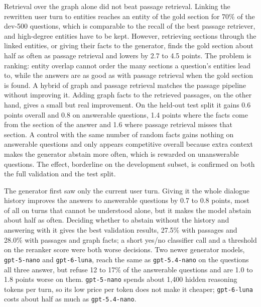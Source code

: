 Retrieval over the graph alone did not beat passage retrieval. Linking the rewritten
user turn to entities reaches an entity of the gold section for 70\% of the dev-500
questions, which is comparable to the recall of the best passage retriever, and
high-degree entities have to be kept. However, retrieving sections through the linked
entities, or giving their facts to the generator, finds the gold section about half as
often as passage retrieval and lowers \fone{} by 2.7 to 4.5 points. The problem is
ranking: entity overlap cannot order the many sections a question's entities lead to,
while the answers are as good as with passage retrieval when the gold section is found.
A hybrid of graph and passage retrieval matches the passage pipeline without improving
it. Adding graph facts to the retrieved passages, on the other hand, gives a small but
real improvement. On the held-out test split it gains 0.6 points overall and 0.8 on
answerable questions, 1.4 points where the facts come from the section of the answer and
1.6 where passage retrieval misses that section. A control with the same number of random
facts gains nothing on answerable questions and only appears competitive overall because
extra context makes the generator abstain more often, which is rewarded on unanswerable
questions. The effect, borderline on the development subset, is confirmed on both the full
validation and the test split.

The generator first saw only the current user turn. Giving it the whole dialogue history
improves the answers to answerable questions by 0.7 to 0.8 points, most of all on turns
that cannot be understood alone, but it makes the model abstain about half as often.
Deciding whether to abstain without the history and answering with it gives the best
validation results, 27.5\% with passages and 28.0\% with passages and graph facts; a short
yes/no classifier call and a threshold on the reranker score were both worse decisions.
Two newer generator models, \texttt{gpt-5-nano} and \texttt{gpt-6-luna}, reach the same
\fone{} as \texttt{gpt-5.4-nano} on the questions all three answer, but refuse 12 to 17\% of
the answerable questions and are 1.0 to 1.8 points worse on them. \texttt{gpt-5-nano} spends
about 1{,}400 hidden reasoning tokens per turn, so its low price per token does not make it
cheaper; \texttt{gpt-6-luna} costs about half as much as \texttt{gpt-5.4-nano}.

